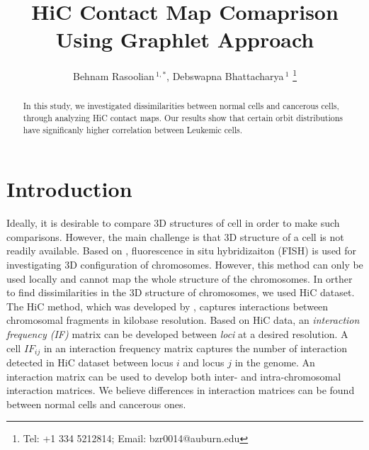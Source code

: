 \documentclass[a4,center,fleqn]{NAR}
\begin{document}
\title{HiC Contact Map Comaprison Using Graphlet Approach}

\author{%
    Behnam Rasoolian\,$^{1,*}$,
    Debswapna Bhattacharya\,$^{1}$
    \footnote{
    Tel: +1 334 5212814; Email: bzr0014@auburn.edu}}

    \address{%
        $^{1}$ Auburn University
        }


            \maketitle

\begin{abstract}

In this study, we investigated
dissimilarities between normal cells and cancerous cells,
through analyzing HiC contact maps. 
Our results show that certain orbit distributions
have significanly higher correlation 
between Leukemic cells.

\end{abstract}

\section{Introduction}

Ideally, it is desirable to compare 3D structures of 
cell in order to make such comparisons.
However, the main challenge is that 
3D structure of a cell is not readily available. Based on
\cite{adhikari2016chromosome3d}, fluorescence in situ hybridizaiton
(FISH) is used for investigating 3D configuration of chromosomes.
However, this method can only be used locally and cannot map
the whole structure of the chromosomes.
In orther to find dissimilarities in the 3D structure of 
chromosomes, we used HiC dataset.
The HiC method, which was developed by 
\cite{lieberman2009comprehensive}, captures interactions between 
chromosomal fragments in kilobase resolution. Based on HiC data, an
\textit{interaction frequency (IF) } matrix can be developed between \textit{loci} at a desired resolution.
A cell $IF_{ij}$ in an interaction frequency matrix captures the number of interaction detected
in HiC dataset between locus $i$ and locus $j$ in the genome.
An interaction matrix can be used to develop both inter- and intra-chromosomal interaction matrices.
We believe differences in interaction matrices can be found between normal cells and cancerous ones.
\end{document}
